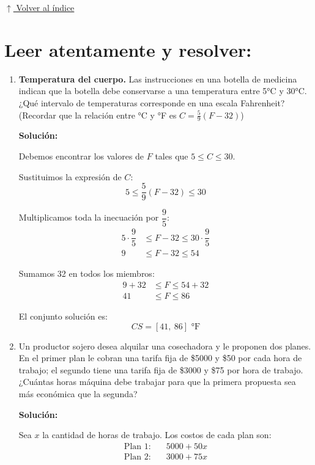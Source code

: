 \documentclass[12pt]{article}
\newcommand{\solucion}{%
    \vspace{0.8em}%
    \textbf{Solución:}%
}
\newcommand{\volverindice}{%
    \vspace{1em}%
    \begin{flushright}%
        \hyperlink{indice}{\small $\uparrow$ Volver al índice}%
    \end{flushright}%
}
\begin{document}
\volverindice

\section[Problemas con inecuaciones]{Leer atentamente y resolver:}

\begin{enumerate}[label=\alph*.-]

    \item \textbf{Temperatura del cuerpo.} Las instrucciones en una botella de medicina indican que la botella debe conservarse a una temperatura entre 5°C y 30°C. ¿Qué intervalo de temperaturas corresponde en una escala Fahrenheit? (Recordar que la relación entre °C y °F es $C = \frac{5}{9}(F - 32)$)

    \solucion

    Debemos encontrar los valores de $F$ tales que $5 \leq C \leq 30$.

    Sustituimos la expresión de $C$:
    \[
    5 \leq \dfrac{5}{9}(F - 32) \leq 30
    \]

    Multiplicamos toda la inecuación por $\dfrac{9}{5}$:
    \begin{align*}
    5 \cdot \dfrac{9}{5} &\leq F - 32 \leq 30 \cdot \dfrac{9}{5} \\[0.3em]
    9 &\leq F - 32 \leq 54
    \end{align*}

    Sumamos 32 en todos los miembros:
    \begin{align*}
    9 + 32 &\leq F \leq 54 + 32 \\[0.3em]
    41 &\leq F \leq 86
    \end{align*}

    El conjunto solución es:
    \[
    \boxed{CS = [41,\ 86] \text{ °F}}
    \]

    \newpage
    \item Un productor sojero desea alquilar una cosechadora y le proponen dos planes. En el primer plan le cobran una tarifa fija de \$5000 y \$50 por cada hora de trabajo; el segundo tiene una tarifa fija de \$3000 y \$75 por hora de trabajo. ¿Cuántas horas máquina debe trabajar para que la primera propuesta sea más económica que la segunda?

    \solucion

    Sea $x$ la cantidad de horas de trabajo. Los costos de cada plan son:
    \begin{align*}
    \text{Plan 1:} &\quad 5000 + 50x \\
    \text{Plan 2:} &\quad 3000 + 75x
    \end{align*}


\end{enumerate}
\end{document}
